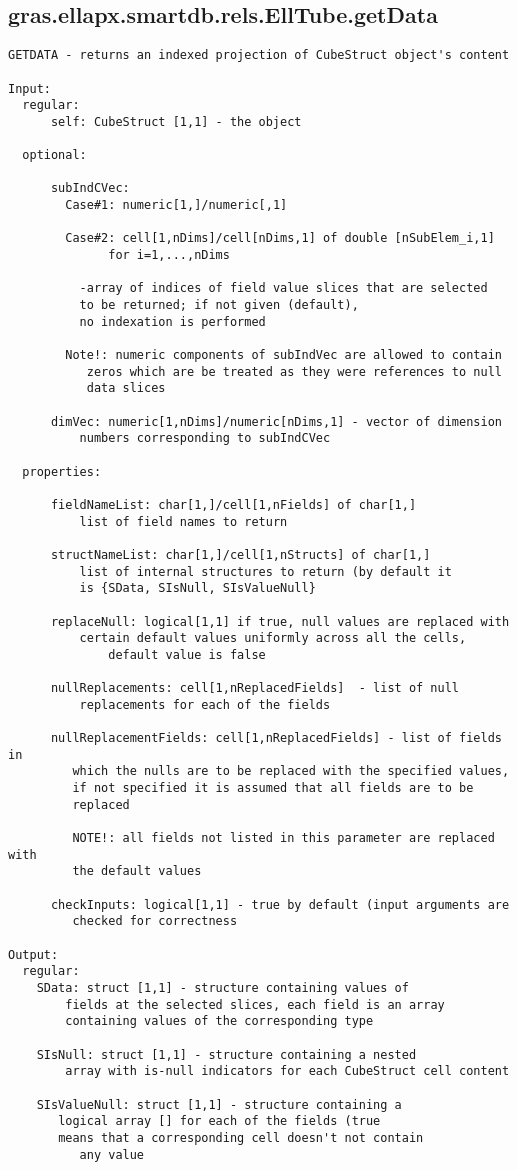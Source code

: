 \subsection{\texorpdfstring{gras.ellapx.smartdb.rels.EllTube.getData}{getData}}\label{method:gras.ellapx.smartdb.rels.EllTube.getData}
\begin{verbatim}
GETDATA - returns an indexed projection of CubeStruct object's content

Input:
  regular:
      self: CubeStruct [1,1] - the object

  optional:

      subIndCVec:
        Case#1: numeric[1,]/numeric[,1]

        Case#2: cell[1,nDims]/cell[nDims,1] of double [nSubElem_i,1]
              for i=1,...,nDims

          -array of indices of field value slices that are selected
          to be returned; if not given (default),
          no indexation is performed

        Note!: numeric components of subIndVec are allowed to contain
           zeros which are be treated as they were references to null
           data slices

      dimVec: numeric[1,nDims]/numeric[nDims,1] - vector of dimension
          numbers corresponding to subIndCVec

  properties:

      fieldNameList: char[1,]/cell[1,nFields] of char[1,]
          list of field names to return

      structNameList: char[1,]/cell[1,nStructs] of char[1,]
          list of internal structures to return (by default it
          is {SData, SIsNull, SIsValueNull}

      replaceNull: logical[1,1] if true, null values are replaced with
          certain default values uniformly across all the cells,
              default value is false

      nullReplacements: cell[1,nReplacedFields]  - list of null
          replacements for each of the fields

      nullReplacementFields: cell[1,nReplacedFields] - list of fields in
         which the nulls are to be replaced with the specified values,
         if not specified it is assumed that all fields are to be
         replaced

         NOTE!: all fields not listed in this parameter are replaced with
         the default values

      checkInputs: logical[1,1] - true by default (input arguments are
         checked for correctness

Output:
  regular:
    SData: struct [1,1] - structure containing values of
        fields at the selected slices, each field is an array
        containing values of the corresponding type

    SIsNull: struct [1,1] - structure containing a nested
        array with is-null indicators for each CubeStruct cell content

    SIsValueNull: struct [1,1] - structure containing a
       logical array [] for each of the fields (true
       means that a corresponding cell doesn't not contain
          any value
\end{verbatim}
